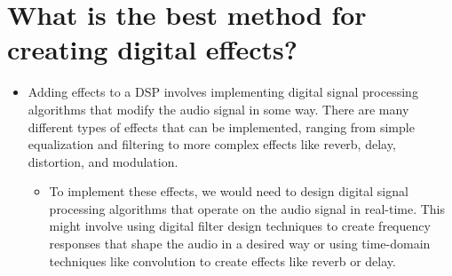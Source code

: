     \section{What is the best method for creating digital effects?}
        \begin{itemize}
            \setlength\itemsep{-0.3em}
            \item Adding effects to a DSP involves implementing digital signal processing algorithms that modify the audio signal in some way. There are many different types of effects that can be implemented, ranging from simple equalization and filtering to more complex effects like reverb, delay, distortion, and modulation.
            \begin{itemize}
                \setlength\itemsep{-0.3em}
                \item To implement these effects, we would need to design digital signal processing algorithms that operate on the audio signal in real-time. This might involve using digital filter design techniques to create frequency responses that shape the audio in a desired way or using time-domain techniques like convolution to create effects like reverb or delay.
            \end{itemize}
        \end{itemize}

